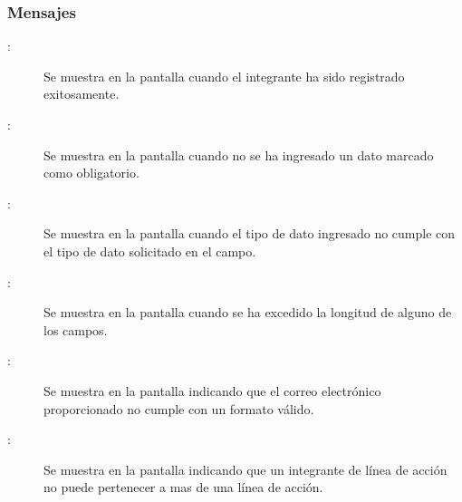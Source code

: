 \subsubsection{Mensajes}
    \begin{description}
      \item[:] Se muestra en la pantalla  cuando el integrante ha sido registrado exitosamente.
      \item[:] Se muestra en la pantalla  cuando no se ha ingresado un dato marcado como obligatorio.
      \item[:] Se muestra en la pantalla  cuando el tipo de dato ingresado no cumple con el tipo de dato solicitado en el campo.
      \item[:] Se muestra en la pantalla  cuando se ha excedido la longitud de alguno de los campos.
      \item[:] Se muestra en la pantalla  indicando que el correo electrónico proporcionado no cumple con un formato válido. 
      \item [:] Se muestra en la pantalla  indicando que un integrante de línea de acción no puede pertenecer a mas de una línea de acción.
    \end{description}
